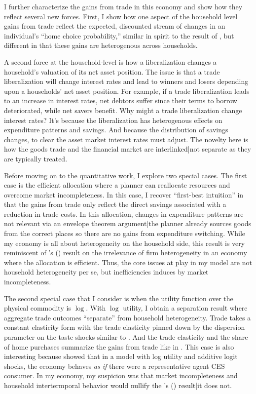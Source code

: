 \documentclass[12pt,pdftex]{article}
\def\citeapos#1{\citeauthor{#1}'s (\citeyear{#1})}
\begin{document}
\begin{onehalfspacing}
I further characterize the gains from trade in this economy and show how they reflect several new forces. First, I show how one aspect of the household level gains from trade reflect the expected, discounted stream of changes in an individual's ``home choice probability,''  similar in spirit to the result of \citet*{arkolakis2012new}, but different in that these gains are heterogenous across households.

A second force at the household-level is how a liberalization changes a household's valuation of its net asset position. The issue is that a trade liberalization will change interest rates and lead to winners and losers depending upon a households' net asset position. For example, if a trade liberalization leads to an increase in interest rates, net debtors suffer since their terms to borrow deteriorated, while net savers benefit. Why might a trade liberalization change interest rates? It's because the liberalization has heterogenous effects on expenditure patterns and savings. And because the distribution of savings changes, to clear the asset market interest rates must adjust. The novelty here is how the goods trade and the financial market are interlinked|not separate as they are typically treated.

Before moving on to the quantitative work, I explore two special cases. The first case is the efficient allocation where a planner can reallocate resources and overcome market incompleteness. In this case, I recover ``first-best intuition'' in that the gains from trade only reflect the direct savings associated with a reduction in trade costs. In this allocation, changes in expenditure patterns are not relevant via an envelope theorem argument|the planner already sources goods from the correct places so there are no gains from expenditure switching. While my economy is all about heterogeneity on the household side, this result is very reminiscent of \citeapos{AtkesonBurstein2010} result on the irrelevance of firm heterogeneity in an economy where the allocation is efficient. Thus, the core issues at play in my model are not household heterogeneity per se, but inefficiencies induces by market incompleteness. 

The second special case that I consider is when the utility function over the physical commodity is $\log$. With $\log$ utility, I obtain a separation result where aggregate trade outcomes ``separate'' from household heterogeneity. Trade takes a constant elasticity form with the trade elasticity pinned down by the dispersion parameter on the taste shocks similar to \citet{eaton2002technology}. And the trade elasticity and the share of home purchases summarize the gains from trade like in \citet{arkolakis2012new}. This case is also interesting because \citet*{anderson1987ces} showed that in a model with log utility and additive logit shocks, the economy behaves \emph{as if} there were a representative agent CES consumer. In my economy, my suspicion was that market incompleteness and household intertermporal behavior would nullify the \citeapos{anderson1987ces} result|it does not.


\end{onehalfspacing}
\end{document}
